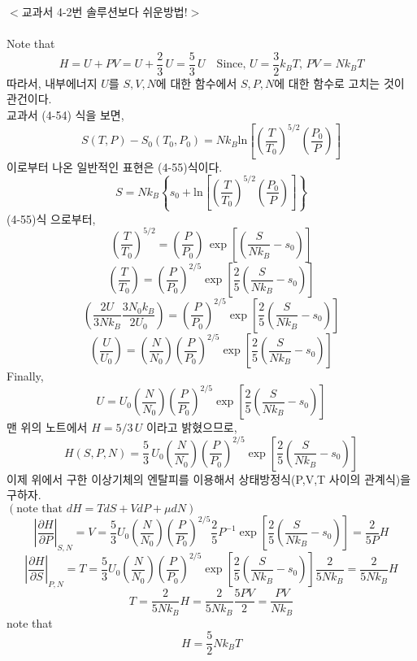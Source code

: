 \documentclass[a4paper,12pt]{article}
\begin{document}
	\begin{flushleft}
		$<$교과서 4-2번 솔루션보다 쉬운방법!$>$ 
	\end{flushleft}
\paragraph{}
Note that $$H=U+PV=U+\frac{2}{3}\,U=\frac{5}{3}\,U\quad \mbox{Since, }U=\frac{3}{2}k_{B}T,\,PV=Nk_BT$$
따라서, 내부에너지 $U$를 $S,V,N$에 대한 함수에서 $S,P,N$에 대한 함수로 고치는 것이 관건이다. \\교과서 (4-54) 식을 보면,
$$S(T,P)-S_0(T_0,P_0)=Nk_B\mbox{ln}\left[\left(\frac{T}{T_0} \right)^{5/2}\left(\frac{P_0}{P} \right)   \right] $$
이로부터 나온 일반적인 표현은 (4-55)식이다.
$$S=Nk_B \left\lbrace s_0+\mbox{ln}\left[\left(\frac{T}{T_0} \right)^{5/2}\left(\frac{P_0}{P} \right) \right] \right\rbrace $$
(4-55)식 으로부터,
$$\left(\frac{T}{T_0} \right)^{5/2}=\left(\frac{P}{P_0}\right)\,\exp\left[\left(\frac{S}{Nk_B}-s_0 \right)  \right]   $$
$$\left(\frac{T}{T_0} \right)=\left(\frac{P}{P_0}\right)^{2/5}\exp\left[\frac{2}{5}\left(\frac{S}{Nk_B}-s_0 \right)  \right]   $$
$$\left(\frac{2U}{3Nk_B}\frac{3N_0k_B}{2U_0} \right)=\left(\frac{P}{P_0}\right)^{2/5}\exp\left[\frac{2}{5}\left(\frac{S}{Nk_B}-s_0 \right)  \right]   $$
$$\left(\frac{U}{U_0} \right)=\left(\frac{N}{N_0} \right) \left(\frac{P}{P_0}\right)^{2/5}\exp\left[\frac{2}{5}\left(\frac{S}{Nk_B}-s_0 \right)  \right]   $$
Finally,
$$U=U_0\left(\frac{N}{N_0} \right) \left(\frac{P}{P_0}\right)^{2/5}\exp\left[\frac{2}{5}\left(\frac{S}{Nk_B}-s_0 \right)  \right]   $$
맨 위의 노트에서 $H=5/3\,U$ 이라고 밝혔으므로,
$$H(S,P,N)=\frac{5}{3}\,U_0\left(\frac{N}{N_0} \right) \left(\frac{P}{P_0}\right)^{2/5}\exp\left[\frac{2}{5}\left(\frac{S}{Nk_B}-s_0 \right)  \right]   $$
이제 위에서 구한 이상기체의 엔탈피를 이용해서 상태방정식(P,V,T 사이의 관계식)을 구하자. \\$(\mbox{note that }dH=TdS+VdP+\mu dN)$
$$\left|\frac{\partial H}{\partial P} \right| _{S,N}=V=\frac{5}{3}U_0\left(\frac{N}{N_0} \right)\left(\frac{P}{P_0} \right)^{2/5}\frac{2}{5}P^{-1}\exp\left[\frac{2}{5}\left(\frac{S}{Nk_B}-s_0 \right)  \right]=\frac{2}{5P}H  $$
$$\left|\frac{\partial H}{\partial S} \right| _{P,N}=T=\frac{5}{3}U_0\left(\frac{N}{N_0} \right)\left(\frac{P}{P_0} \right)^{2/5}\exp\left[\frac{2}{5}\left(\frac{S}{Nk_B}-s_0 \right)  \right]\frac{2}{5Nk_B}=\frac{2}{5Nk_B}H  $$
$$T=\frac{2}{5Nk_B}H=\frac{2}{5Nk_B}\frac{5PV}{2}=\frac{PV}{Nk_B}$$
note that $$H=\frac{5}{2}Nk_BT$$
\end{document}
